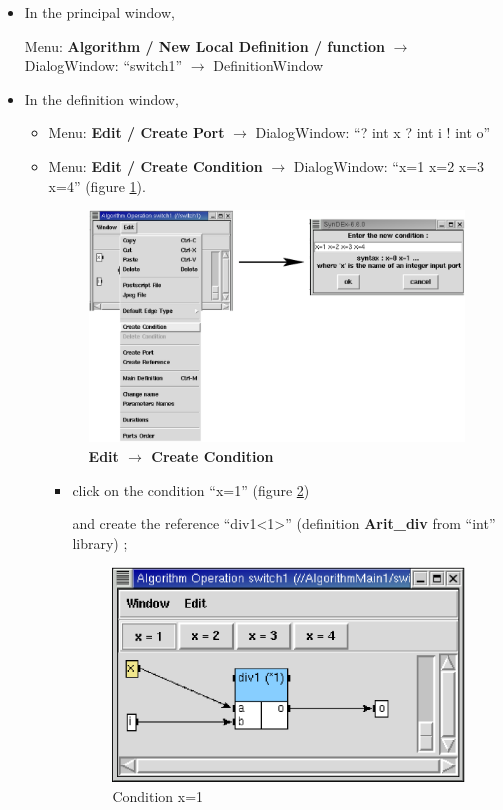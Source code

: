 \documentclass[a4paper,twoside]{report}
\begin{document}
\begin{itemize}
\item In the principal window,

Menu: \textbf{Algorithm / New Local Definition / function} $\rightarrow$
DialogWindow: ``switch1'' $\rightarrow$ DefinitionWindow

\item In the definition window, 
\begin{itemize}
\item Menu: \textbf{Edit / Create Port} $\rightarrow$ DialogWindow: ``? int x ?
int i !  int o''

\item Menu: \textbf{Edit / Create Condition} $\rightarrow$ DialogWindow: ``x=1
x=2 x=3 x=4'' (figure \ref{condition}).

\begin{figure}[htbp]
  \begin{center} 
        \includegraphics[width=1.1\linewidth]{Edit_CreateCondition.eps} 
  \end{center}
  \caption{\textbf{Edit $\rightarrow$ Create Condition}}
  \label{condition}
\end{figure}
\begin{itemize}
\item click on the condition ``x=1'' (figure \ref{condition1}) 

and create the reference ``div1<1>'' (definition \textbf{Arit\_div} from
``int'' library) ;

\begin{figure}[htbp]
  \begin{center} 
        \includegraphics[width=0.5\linewidth]{Condition1.eps} 
  \end{center}
  \caption{Condition x=1}
  \label{condition1}
\end{figure}


\end{itemize}
\end{itemize}
\end{itemize}
\end{document}
